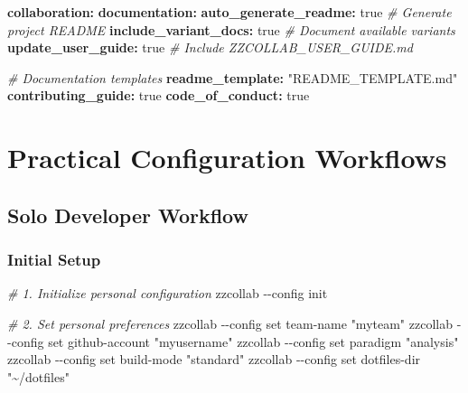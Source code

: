 \documentclass[
]{article}
\newenvironment{Shaded}{\begin{snugshade}}{\end{snugshade}}
\newcommand{\AttributeTok}[1]{\textcolor[rgb]{0.13,0.29,0.53}{#1}}
\newcommand{\CharTok}[1]{\textcolor[rgb]{0.31,0.60,0.02}{#1}}
\newcommand{\CommentTok}[1]{\textcolor[rgb]{0.56,0.35,0.01}{\textit{#1}}}
\newcommand{\ExtensionTok}[1]{#1}
\newcommand{\FunctionTok}[1]{\textcolor[rgb]{0.13,0.29,0.53}{\textbf{#1}}}
\newcommand{\KeywordTok}[1]{\textcolor[rgb]{0.13,0.29,0.53}{\textbf{#1}}}
\newcommand{\NormalTok}[1]{#1}
\newcommand{\StringTok}[1]{\textcolor[rgb]{0.31,0.60,0.02}{#1}}
\begin{document}
\begin{Shaded}
\begin{Highlighting}[]
\FunctionTok{collaboration}\KeywordTok{:}
\AttributeTok{  }\FunctionTok{documentation}\KeywordTok{:}
\AttributeTok{    }\FunctionTok{auto\_generate\_readme}\KeywordTok{:}\AttributeTok{ }\CharTok{true}\CommentTok{       \# Generate project README}
\AttributeTok{    }\FunctionTok{include\_variant\_docs}\KeywordTok{:}\AttributeTok{ }\CharTok{true}\CommentTok{       \# Document available variants}
\AttributeTok{    }\FunctionTok{update\_user\_guide}\KeywordTok{:}\AttributeTok{ }\CharTok{true}\CommentTok{          \# Include ZZCOLLAB\_USER\_GUIDE.md}

\CommentTok{    \# Documentation templates}
\AttributeTok{    }\FunctionTok{readme\_template}\KeywordTok{:}\AttributeTok{ }\StringTok{"README\_TEMPLATE.md"}
\AttributeTok{    }\FunctionTok{contributing\_guide}\KeywordTok{:}\AttributeTok{ }\CharTok{true}
\AttributeTok{    }\FunctionTok{code\_of\_conduct}\KeywordTok{:}\AttributeTok{ }\CharTok{true}
\end{Highlighting}
\end{Shaded}

\section{Practical Configuration
Workflows}\label{practical-configuration-workflows}

\subsection{Solo Developer Workflow}\label{solo-developer-workflow}

\subsubsection{Initial Setup}\label{initial-setup}

\begin{Shaded}
\begin{Highlighting}[]
\CommentTok{\# 1. Initialize personal configuration}
\ExtensionTok{zzcollab} \AttributeTok{{-}{-}config}\NormalTok{ init}

\CommentTok{\# 2. Set personal preferences}
\ExtensionTok{zzcollab} \AttributeTok{{-}{-}config}\NormalTok{ set team{-}name }\StringTok{"myteam"}
\ExtensionTok{zzcollab} \AttributeTok{{-}{-}config}\NormalTok{ set github{-}account }\StringTok{"myusername"}
\ExtensionTok{zzcollab} \AttributeTok{{-}{-}config}\NormalTok{ set paradigm }\StringTok{"analysis"}
\ExtensionTok{zzcollab} \AttributeTok{{-}{-}config}\NormalTok{ set build{-}mode }\StringTok{"standard"}
\ExtensionTok{zzcollab} \AttributeTok{{-}{-}config}\NormalTok{ set dotfiles{-}dir }\StringTok{"\textasciitilde{}/dotfiles"}
\end{Highlighting}
\end{Shaded}
\end{document}
